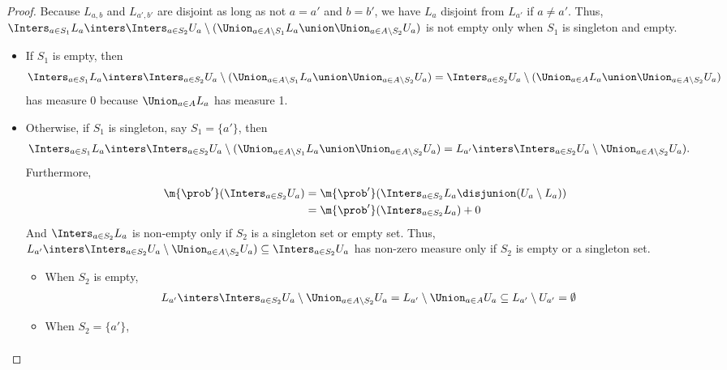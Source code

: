 \documentclass[acmsmall,nonacm,screen,appendix]{acmart}
\begin{document}
\begin{proof}
      Because $L_{a,b}$ and $L_{a',b'}$ are disjoint as long as not
      $a = a'$ and $b = b'$,
      we have $L_a$ disjoint from $L_{a'}$ if $a \neq a'$.
      Thus,
      $\Inters_{a \in S_1} L_a \inters \Inters_{a \in S_2} U_a \setminus (\Union_{a \in A \setminus S_1} L_a \union \Union_{a \in A \setminus S_2} U_a)$
      is not empty only when $S_1$ is singleton and empty.
      \begin{itemize}
        \item If $S_1$ is empty,
      then
      \[
        \Inters_{a \in S_1} L_a \inters \Inters_{a \in S_2} U_a \setminus (\Union_{a \in A \setminus S_1} L_a \union \Union_{a \in A \setminus S_2} U_a)
        =  \Inters_{a \in S_2} U_a \setminus (\Union_{a \in A} L_a \union \Union_{a \in A \setminus S_2} U_a)
      \]
      has measure 0 because $\Union_{a \in A} L_a$ has measure 1.
        \item Otherwise, if $S_1$ is singleton, say $S_1 = \{a'\}$,
      then
      \begin{align*}
        \Inters_{a \in S_1} L_a \inters \Inters_{a \in S_2} U_a \setminus (\Union_{a \in A \setminus S_1} L_a \union \Union_{a \in A \setminus S_2} U_a)
        &= L_{a'} \inters \Inters_{a \in S_2} U_a \setminus \Union_{a \in A \setminus S_2} U_a).
      \end{align*}
Furthermore,
      \begin{align*}
        \m{\prob'}(\Inters_{a \in S_2} U_a)
        &= \m{\prob'}(\Inters_{a \in S_2} L_a \disjunion (U_a \setminus L_a)) \\
        &= \m{\prob'}(\Inters_{a \in S_2} L_a) + 0
      \end{align*}
      And $\Inters_{a \in S_2} L_a$ is non-empty only if
      $S_2$ is a singleton set or empty set.
      Thus, $L_{a'} \inters \Inters_{a \in S_2} U_a \setminus \Union_{a \in A \setminus S_2} U_a) \subseteq \Inters_{a \in S_2} U_a$ has non-zero measure only if
      $S_2$ is empty or a singleton set.
\begin{itemize}
        \item When $S_2$ is empty,
      \begin{align*}
        L_{a'} \inters \Inters_{a \in S_2} U_a \setminus \Union_{a \in A \setminus S_2} U_a
        &= L_{a'} \setminus \Union_{a \in A} U_a
        \subseteq L_{a'} \setminus  U_{a'}
        =\emptyset
      \end{align*}
        \item When $S_2 = \{a'\}$,
      \begin{align*}

\end{align*}
\end{itemize}
\end{itemize}
\end{proof}
\end{document}
